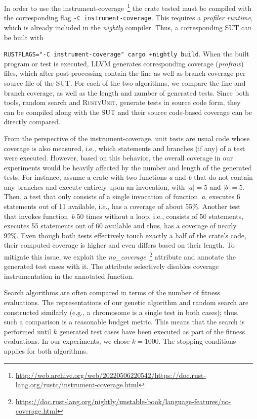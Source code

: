 \documentclass[paper=a4,%
  twoside,%
  BCOR4mm,%
  abstract=true,%
  toc=bibliography,%
  chapterprefix=true,%
  toc=bibliographynumbered,%
  open=right,%
  english,%
  pagesize=pdftex]{scrreprt}
\newcommand{\tech}{\textsc{RustyUnit}\xspace}
\newcommand{\budget}{1000\xspace}
\newcommand{\sut}{\ac{SUT}\xspace}
\begin{document}
In order to use the instrument-coverage~\footnote{\url{http://web.archive.org/web/20220506220542/https://doc.rust-lang.org/rustc/instrument-coverage.html}} the crate tested must be compiled with the corresponding flag \texttt{-C instrument-coverage}. This requires a \emph{profiler runtime}, which is already included in the \emph{nightly} compiler. Thus, a corresponding \sut can be built with \raggedright\texttt{RUSTFLAGS="-C instrument-coverage" cargo +nightly build}. When the built program or test is executed, LLVM generates corresponding coverage (\emph{profraw}) files, which after post-processing contain the line as well as branch coverage per source file of the \sut. For each of the two algorithms, we compare the line and branch coverage, as well as the length and number of generated tests. Since both tools, random search and \tech, generate tests in source code form, they can be compiled along with the \sut and their source code-based coverage can be directly compared. 

From the perspective of the instrument-coverage, unit tests are usual code whose coverage is also measured, i.e., which statements and branches (if any) of a test were executed. However, based on this behavior, the overall coverage in our experiments would be heavily affected by the number and length of the generated tests. For instance, assume a crate with two functions \emph{a} and \emph{b} that do not contain any branches and execute entirely upon an invocation, with $\left|a\right| = 5$ and $\left|b\right| = 5$. Then, a test that only consists of a single invocation of function~\emph{a}, executes 6 statements out of 11 available, i.e., has a coverage of about 55\%. Another test that invokes function~\emph{b} 50 times without a loop, i.e., consists of 50 statements, executes 55 statements out of 60 available and thus, has a coverage of nearly 92\%. Even though both tests effectively touch exactly a half of the crate's code, their computed coverage is higher and even differs based on their length. To mitigate this issue, we exploit the \emph{no\_coverage}~\footnote{\url{https://doc.rust-lang.org/nightly/unstable-book/language-features/no-coverage.html}} attribute and annotate the generated test cases with it. The attribute selectively disables coverage instrumentation in the annotated function.

Search algorithms are often compared in terms of the number of fitness evaluations. The representations of our genetic algorithm and random search are constructed similarly (e.g., a chromosome is a single test in both cases); thus, such a comparison is a reasonable budget metric. This means that the search is performed until $k$ generated test cases have been executed as part of the fitness evaluations. In our experiments, we chose $k = \budget$. The stopping conditions applies for both algorithms.
\end{document}
